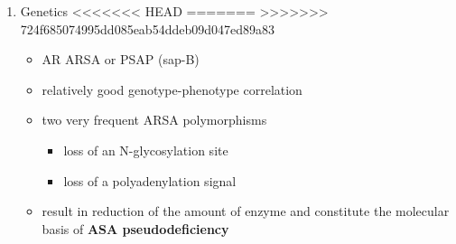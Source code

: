 \documentclass[fontsize=12pt]{scrartcl}
\begin{document}
\begin{enumerate}
\begin{enumerate}
\begin{enumerate}
\begin{enumerate}
\begin{table}[htbp]
\begin{enumerate}
\begin{enumerate}
\begin{table}[htbp]
\begin{enumerate}
\begin{itemize}
\begin{itemize}
\begin{enumerate}
\begin{enumerate}
\begin{enumerate}
\begin{enumerate}
\begin{enumerate}
\begin{itemize}
\item sulfatide is component of the myelin sheath
\item sulfatide:galactocerebroside ratio \(\to\) stability and physiological properties of this membrane
\item \(\uparrow\) sulfatides in CNS and PNS \(\to\) demyelination
\item \(\uparrow\) sulfatide in the kidney \(\to\) sulfatide in urine
\end{itemize}

\item Genetics
<<<<<<< HEAD
\label{sec:orge733e00}
=======
\label{sec:org3de0521}
>>>>>>> 724f685074995dd085eab54ddeb09d047ed89a83
\begin{itemize}
\item AR ARSA or PSAP (sap-B)
\item relatively good genotype-phenotype correlation
\item two very frequent ARSA polymorphisms 
\begin{itemize}
\item loss of an N-glycosylation site
\item loss of a polyadenylation signal
\end{itemize}
\item result in reduction of the amount of enzyme and constitute the
molecular basis of \textbf{ASA pseudodeficiency}
\end{itemize}


\end{enumerate}
\end{enumerate}
\end{enumerate}
\end{enumerate}
\end{enumerate}
\end{itemize}
\end{itemize}
\end{enumerate}
\end{table}
\end{enumerate}
\end{enumerate}
\end{table}
\end{enumerate}
\end{enumerate}
\end{enumerate}
\end{enumerate}
\end{document}
